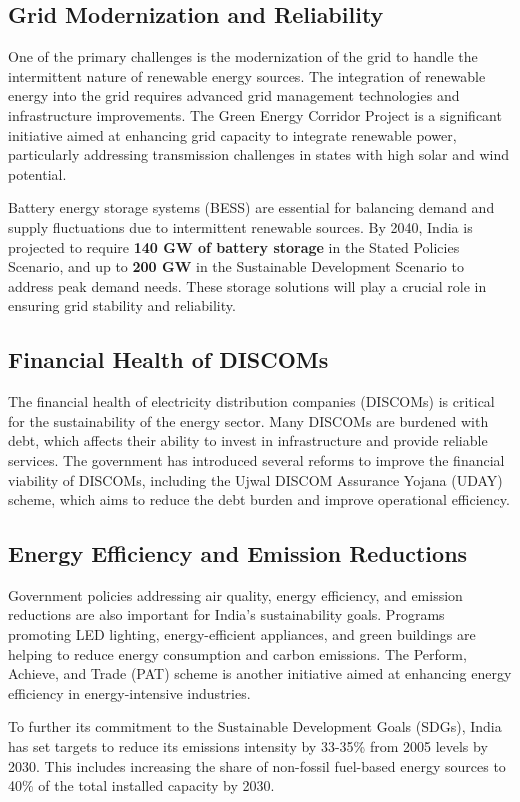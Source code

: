 \documentclass[12pt]{article}
\begin{document}
\begin{spacing}{1.5}
\subsection*{Grid Modernization and Reliability}
One of the primary challenges is the modernization of the grid to handle the intermittent nature of renewable energy sources. The integration of renewable energy into the grid requires advanced grid management technologies and infrastructure improvements. The Green Energy Corridor Project is a significant initiative aimed at enhancing grid capacity to integrate renewable power, particularly addressing transmission challenges in states with high solar and wind potential.

Battery energy storage systems (BESS) are essential for balancing demand and supply fluctuations due to intermittent renewable sources. By 2040, India is projected to require \textbf{140 GW of battery storage} in the Stated Policies Scenario, and up to \textbf{200 GW} in the Sustainable Development Scenario to address peak demand needs. These storage solutions will play a crucial role in ensuring grid stability and reliability.

\subsection*{Financial Health of DISCOMs}
The financial health of electricity distribution companies (DISCOMs) is critical for the sustainability of the energy sector. Many DISCOMs are burdened with debt, which affects their ability to invest in infrastructure and provide reliable services. The government has introduced several reforms to improve the financial viability of DISCOMs, including the Ujwal DISCOM Assurance Yojana (UDAY) scheme, which aims to reduce the debt burden and improve operational efficiency.

\subsection*{Energy Efficiency and Emission Reductions}
Government policies addressing air quality, energy efficiency, and emission reductions are also important for India’s sustainability goals. Programs promoting LED lighting, energy-efficient appliances, and green buildings are helping to reduce energy consumption and carbon emissions. The Perform, Achieve, and Trade (PAT) scheme is another initiative aimed at enhancing energy efficiency in energy-intensive industries.

To further its commitment to the Sustainable Development Goals (SDGs), India has set targets to reduce its emissions intensity by 33-35\% from 2005 levels by 2030. This includes increasing the share of non-fossil fuel-based energy sources to 40\% of the total installed capacity by 2030.


\end{spacing}
\end{document}
